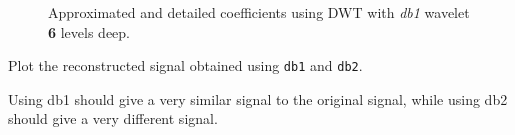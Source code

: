 \begin{figure}[H]
    \centering

    \caption{Approximated and detailed coefficients using DWT with \textit{db1} wavelet \textbf{6} levels deep. }
    \label{fig:Q1a}
\end{figure}



\begin{tcolorbox}[colback=red!5!white,colframe=red!75!black,title=Problem 1.b]
    Plot the reconstructed signal obtained using \verb|db1| and \verb|db2|.
\end{tcolorbox}

Using db1 should give a very similar signal to the original signal, while using db2 should give a very different signal.


